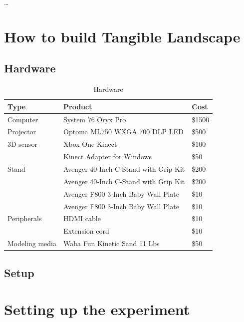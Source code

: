 \documentclass[prodmode,acmtochi]{acmsmall} %
\begin{document}
\begin{acks}
\ldots
\end{acks}





\elecappendix

\medskip

\section{How to build Tangible Landscape}

\subsection{Hardware}
\begin{table}[hp!] \footnotesize \center
\caption{Hardware}
{\tabulinesep=1.2mm
\begin{tabu}{l l l}
\toprule
Type & Product & Cost\\
\midrule
Computer & System 76 Oryx Pro & \$1500\\
Projector & Optoma ML750 WXGA 700 DLP LED & \$500\\
3D sensor & Xbox One Kinect & \$100\\
& Kinect Adapter for Windows & \$50\\
Stand & Avenger 40-Inch C-Stand with Grip Kit & \$200\\
& Avenger 40-Inch C-Stand with Grip Kit & \$200\\
& Avenger F800 3-Inch Baby Wall Plate & \$10\\
& Avenger F800 3-Inch Baby Wall Plate & \$10\\
Peripherals & HDMI cable & \$10\\
& Extension cord & \$10\\
Modeling media & Waba Fun Kinetic Sand 11 Lbs & \$50\\
\bottomrule
\end{tabu}}
\label{table:hardware} 
\end{table}

\subsection{Setup}


\section{Setting up the experiment}
\end{document}
